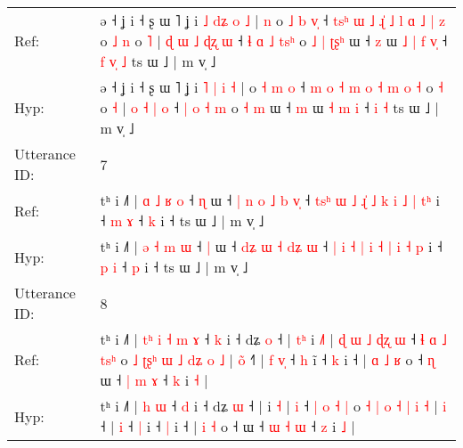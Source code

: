 \documentclass[10pt]{article}
\DeclareRobustCommand{\hl}[1]{{\textcolor{red}{#1}}}
\begin{document}
\begin{longtable}{ll}
Ref: & ə ˧ ʝ i ˧ ʂ ɯ ˥ ʝ i \hl{˩} \hl{d}\hl{ʑ} \hl{o} \hl{˩} |\hl{ }\hl{n} o \hl{˩} \hl{b} \hl{v}\hl{̩} ˧\hl{ }\hl{t}\hl{s}\hl{ʰ} \hl{ɯ} \hl{˩} \hl{ɻ}\hl{̍} \hl{˩} \hl{l} \hl{ɑ} \hl{˩} \hl{|} \hl{z} o\hl{ }\hl{˩} \hl{n} o \hl{˥} |\hl{ }\hl{ɖ} \hl{ɯ} \hl{˩} \hl{ɖ}\hl{ʐ} \hl{ɯ} ˧ \hl{ɬ} \hl{ɑ} \hl{˩} \hl{t}\hl{s}\hl{ʰ} o\hl{ }\hl{˩} \hl{|} \hl{ʈ}\hl{ʂ}\hl{ʰ} ɯ ˧ \hl{z} ɯ\hl{ }\hl{˩} \hl{|} \hl{f} \hl{v}\hl{̩} ˧\hl{ }\hl{f} \hl{v}\hl{̩} \hl{˩} ts ɯ ˩ | m v̩ ˩
 \\
Hyp: & ə ˧ ʝ i ˧ ʂ ɯ ˥ ʝ i \hl{˥} \hl{}\hl{|} \hl{i} \hl{˧} |\hl{}\hl{} o \hl{˧} \hl{m} \hl{}\hl{o} ˧\hl{}\hl{}\hl{}\hl{} \hl{m} \hl{o} \hl{}\hl{˧} \hl{m} \hl{o} \hl{˧} \hl{m} \hl{o} \hl{˧} o\hl{}\hl{} \hl{˧} o \hl{˧} |\hl{}\hl{} \hl{o} \hl{˧} \hl{}\hl{|} \hl{o} ˧ \hl{|} \hl{o} \hl{˧} \hl{}\hl{}\hl{m} o\hl{}\hl{} \hl{˧} \hl{}\hl{}\hl{m} ɯ ˧ \hl{m} ɯ\hl{}\hl{} \hl{˧} \hl{m} \hl{}\hl{i} ˧\hl{}\hl{} \hl{}\hl{i} \hl{˧} ts ɯ ˩ | m v̩ ˩
 \\
\midrule
Utterance ID: & 7 \\
Ref: & tʰ i ˩˥ | \hl{ɑ} \hl{˩} \hl{ʁ} \hl{o} ˧ \hl{ɳ} ɯ ˧ \hl{|}\hl{ }\hl{n} \hl{o} \hl{˩} \hl{b}\hl{ }\hl{v}\hl{̩} ˧ \hl{t}\hl{s}\hl{ʰ} \hl{ɯ} \hl{˩} \hl{ɻ}\hl{̍} \hl{˩} \hl{k} \hl{i} \hl{˩} \hl{|} \hl{t}\hl{ʰ} i ˧ \hl{m} \hl{ɤ} ˧ \hl{k} i ˧ ts ɯ ˩ | m v̩ ˩
 \\
Hyp: & tʰ i ˩˥ | \hl{ə} \hl{˧} \hl{m} \hl{ɯ} ˧ \hl{|} ɯ ˧ \hl{}\hl{d}\hl{ʑ} \hl{ɯ} \hl{˧} \hl{d}\hl{ʑ}\hl{ }\hl{ɯ} ˧ \hl{}\hl{}\hl{|} \hl{i} \hl{˧} \hl{}\hl{|} \hl{i} \hl{˧} \hl{|} \hl{i} \hl{˧} \hl{}\hl{p} i ˧ \hl{p} \hl{i} ˧ \hl{p} i ˧ ts ɯ ˩ | m v̩ ˩
 \\
\midrule
Utterance ID: & 8 \\
Ref: & tʰ i ˩˥ |\hl{ }\hl{t}\hl{ʰ}\hl{ }\hl{i}\hl{ }\hl{˧} \hl{m} \hl{ɤ} ˧ \hl{k} i ˧ dʑ \hl{o} ˧ |\hl{ }\hl{t}\hl{ʰ} i \hl{˩}\hl{˥} |\hl{ }\hl{ɖ}\hl{ }\hl{ɯ}\hl{ }\hl{˩}\hl{ }\hl{ɖ}\hl{ʐ} \hl{ɯ} ˧ \hl{ɬ} \hl{ɑ} \hl{˩} \hl{t}\hl{s}\hl{ʰ} o \hl{˩} \hl{ʈ}\hl{ʂ}\hl{ʰ} \hl{ɯ} \hl{˩} \hl{d}\hl{ʑ} \hl{o} \hl{˩} | \hl{o}\hl{̃} ˧\hl{˥} |\hl{ }\hl{f} \hl{v}\hl{̩} ˧ \hl{h} i\hl{̃} ˧ \hl{k} i ˧ |\hl{ }\hl{ɑ} \hl{˩} \hl{ʁ} o ˧\hl{ }\hl{ɳ} ɯ ˧ \hl{|} \hl{m} \hl{ɤ} ˧ \hl{k} i \hl{˧} |
 \\
Hyp: & tʰ i ˩˥ |\hl{}\hl{}\hl{}\hl{}\hl{}\hl{}\hl{} \hl{h} \hl{ɯ} ˧ \hl{d} i ˧ dʑ \hl{ɯ} ˧ |\hl{}\hl{}\hl{} i \hl{}\hl{˧} |\hl{}\hl{}\hl{}\hl{}\hl{}\hl{}\hl{}\hl{}\hl{} \hl{i} ˧ \hl{|} \hl{o} \hl{˧} \hl{}\hl{}\hl{|} o \hl{˧} \hl{}\hl{}\hl{|} \hl{o} \hl{˧} \hl{}\hl{|} \hl{i} \hl{˧} | \hl{}\hl{i} ˧\hl{} |\hl{}\hl{} \hl{}\hl{i} ˧ \hl{|} i\hl{} ˧ \hl{|} i ˧ |\hl{}\hl{} \hl{i} \hl{˧} o ˧\hl{}\hl{} ɯ ˧ \hl{ɯ} \hl{˧} \hl{ɯ} ˧ \hl{z} i \hl{˩} |

\end{longtable}
\end{document}
